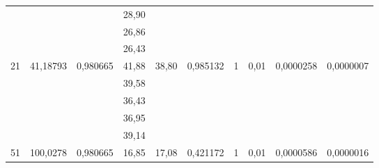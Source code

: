 \documentclass[a4paper, 12pt]{article}
\begin{document}
\begin{table}[h!]
\begin{tabular}{|c|c|c|c|c|c|c|c|c|c|}
                    &                           &                           & 28,90 &                                &                                   &                    &                       &                            &                              \\ \cline{4-4}
                    &                           &                           & 26,86 &                                &                                   &                    &                       &                            &                              \\ \cline{4-4}
                    &                           &                           & 26,43 &                                &                                   &                    &                       &                            &                              \\ \hline
\multirow{5}{*}{21} & \multirow{5}{*}{41,18793} & \multirow{5}{*}{0,980665} & 41,88 & \multirow{5}{*}{38,80}         & \multirow{5}{*}{0,985132}         & \multirow{5}{*}{1} & \multirow{5}{*}{0,01} & \multirow{5}{*}{0,0000258} & \multirow{5}{*}{0,0000007}   \\ \cline{4-4}
                    &                           &                           & 39,58 &                                &                                   &                    &                       &                            &                              \\ \cline{4-4}
                    &                           &                           & 36,43 &                                &                                   &                    &                       &                            &                              \\ \cline{4-4}
                    &                           &                           & 36,95 &                                &                                   &                    &                       &                            &                              \\ \cline{4-4}
                    &                           &                           & 39,14 &                                &                                   &                    &                       &                            &                              \\ \hline
\multirow{5}{*}{51} & \multirow{5}{*}{100,0278} & \multirow{5}{*}{0,980665} & 16,85 & \multirow{5}{*}{17,08}         & \multirow{5}{*}{0,421172}         & \multirow{5}{*}{1} & \multirow{5}{*}{0,01} & \multirow{5}{*}{0,0000586} & \multirow{5}{*}{0,0000016}   \\ \cline{4-4}

\end{tabular}
\end{table}
\end{document}
